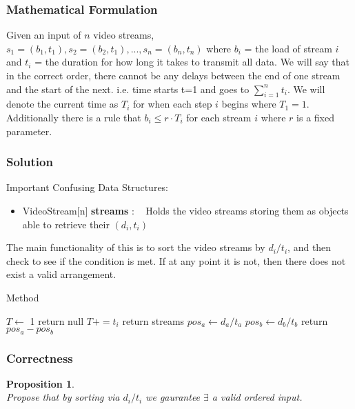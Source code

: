 \documentclass[12pt]{article}
\newtheorem{proposition}[theorem]{Proposition}
\begin{document}
\subsubsection{Mathematical Formulation}
Given an input of $n$ video streams, $s_1 = (b_1,t_1), s_2 = (b_2, t_1),
..., s_n = (b_n,t_n)$ where $b_i$ = the load of stream $i$ and $t_i$ =
the duration for how long it takes to transmit all data. We will say
that in the correct order, there cannot be any delays between the end
of one stream and the start of the next. i.e. time starts t=1 and goes
to $\sum_{i=1}^{n} t_i$. We will denote the current time as $T_i$
for when each step $i$ begins where $T_1 = 1$. Additionally there is a
rule that $b_i \leq r\cdot T_i$ for each stream $i$ where $r$ is a
fixed parameter.

\subsubsection{Solution}
Important Confusing Data Structures:
\begin{itemize}
    \item VideoStream[n] \textbf{streams} : ~ Holds the video streams
    storing them as objects able to retrieve their $(d_i, t_i)$
\end{itemize}

\noindent The main functionality of this is to sort the video streams
by $d_i/t_i$, and then check to see if the condition is met. If at
any point it is not, then there does not exist a valid arrangement.

\begin{algorithm}[H]
\caption{Method}
\begin{algorithmic}
        \State {}
        \State $T \gets$ 1
                \State return null
            \EndIf
            \State $T += t_i$
        \EndFor
        \State return streams
    \EndProcedure
        \State $pos_a \gets d_a/t_a$
        \State $pos_b \gets d_b/t_b$
        \State return $pos_a - pos_b$
    \EndProcedure
\end{algorithmic}
\end{algorithm}



\subsubsection{Correctness}
\begin{proposition}
~ \\ \indent Propose that by sorting via $d_i/t_i$ we gaurantee
$\exists$ a valid ordered input.
\end{proposition}
\end{document}

